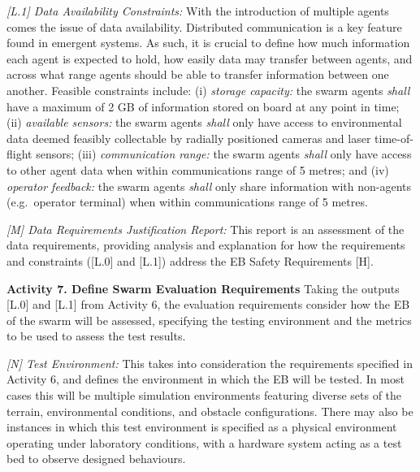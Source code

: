 \documentclass[runningheads]{llncs}
\begin{document}
\emph{[L.1] Data Availability Constraints:}
With the introduction of multiple agents comes the issue of data availability. Distributed communication is a key feature found in emergent systems. As such, it is crucial to define how much information each agent is expected to hold, how easily data may transfer between agents, and across what range agents should be able to transfer information between one another. Feasible constraints include: (i) \emph{storage capacity: }the swarm agents \emph{shall} have a maximum of 2 GB of information stored on board at any point in time; (ii) \emph{available sensors:} the swarm agents \emph{shall} only have access to environmental data deemed feasibly collectable by radially positioned cameras and laser time-of-flight sensors; (iii) \emph{communication range:} the swarm agents \emph{shall} only have access to other agent data when within communications range of 5 metres; and (iv) \emph{operator feedback:} the swarm agents \emph{shall} only share information with non-agents (e.g.\ operator terminal) when within communications range of 5 metres.

\emph{[M] Data Requirements Justification Report:}
This report is an assessment of the data requirements, providing analysis and explanation for how the requirements and constraints ([L.0] and [L.1]) address the EB Safety Requirements [H].

\noindent\textbf{Activity 7. Define Swarm Evaluation Requirements} Taking the outputs [L.0] and [L.1] from Activity 6, the evaluation requirements consider how the EB of the swarm will be assessed, specifying the testing environment and the metrics to be used to assess the test results. %

\emph{[N] Test Environment:} This takes into consideration the requirements specified in Activity 6, and defines the environment in which the EB will be tested. In most cases this will be multiple simulation environments featuring diverse sets of the terrain, environmental conditions, and obstacle configurations. There may also be instances in which this test environment is specified as a physical environment operating under laboratory conditions, with a hardware system acting as a test bed to observe designed behaviours.
\end{document}
